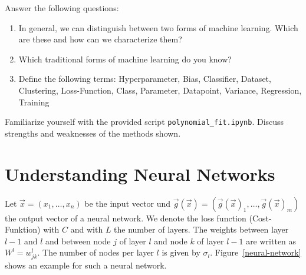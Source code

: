 Answer the following questions:
\begin{enumerate}
    \item In general, we can distinguish between two forms of machine learning.
    Which are these and how can we characterize them?
    \item Which traditional forms of machine learning do you know?
    \item Define the following terms:
    Hyperparameter, Bias, Classifier, Dataset, Clustering, Loss-Function, Class, Parameter, Datapoint, Variance, Regression, Training
\end{enumerate}
%
%
Familiarize yourself with the provided script \texttt{polynomial_fit.ipynb}.
Discuss strengths and weaknesses of the methods shown.
%
%
\section*{Understanding Neural Networks}
Let $\vec{x}=(x_1,\dots,x_n)$ be the input vector und $\vec{g}(\vec{x})=(\vec{g}(\vec{x})_1,\dots,\vec{g}(\vec{x})_m)$ the output vector of a neural network.
We denote the loss function (Cost-Funktion) with $C$ and with $L$ the number of layers.
The weights between layer $l-1$ and $l$ and between node $j$ of layer $l$ and node $k$ of layer $l-1$ are written as $W^l=w^l_{jk}$.
The number of nodes per layer $l$ is given by $\sigma_l$.
Figure~\ref{neural-network} shows an example for such a neural network.
